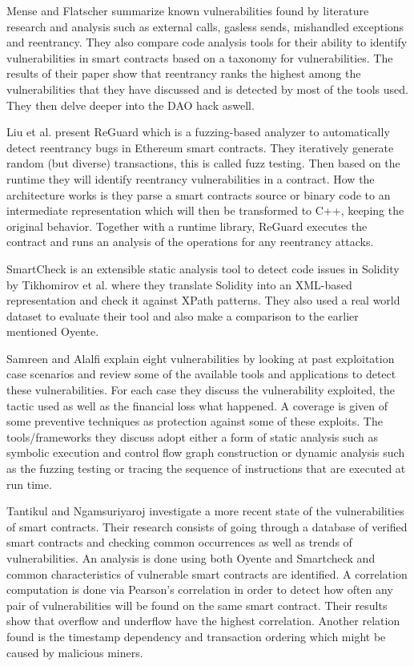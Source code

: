 \documentclass[10pt,conference]{IEEEtran}
\begin{document}
Mense and Flatscher \cite{security} summarize known vulnerabilities found by literature research and analysis such as external calls, gasless sends, mishandled exceptions and reentrancy. They also compare code analysis tools for their ability to identify vulnerabilities in smart contracts based on a taxonomy for vulnerabilities. The results of their paper show that reentrancy ranks the highest among the vulnerabilities that they have discussed and is detected by most of the tools used. They then delve deeper into the DAO hack aswell. 


Liu et al. \cite{reguard} present ReGuard which is a fuzzing-based analyzer to automatically detect reentrancy bugs in Ethereum smart contracts. They iteratively generate random (but diverse) transactions, this is called fuzz testing. Then based on the runtime they will identify reentrancy vulnerabilities in a contract. How the architecture works is they parse a smart contracts source or binary code to an intermediate representation which will then be transformed to C++, keeping the original behavior. Together with a runtime library, ReGuard executes the contract and runs an analysis of the operations for any reentrancy attacks.


SmartCheck is an extensible static analysis tool to detect code issues in Solidity by Tikhomirov et al.\cite{smartcheck} where they translate Solidity into an XML-based representation and check it against XPath patterns. They also used a real world dataset to evaluate their tool and also make a comparison to the earlier mentioned Oyente. 


Samreen and Alalfi  \cite{survey} explain eight vulnerabilities by looking at past exploitation case scenarios and review some of the available tools and applications to detect these vulnerabilities. For each case they discuss the vulnerability exploited, the tactic used as well as the financial loss what happened. A coverage is given of some preventive techniques as protection against some of these exploits. The tools/frameworks they discuss adopt either a form of static analysis such as symbolic execution and control flow graph construction or dynamic analysis such as the fuzzing testing or tracing the sequence of instructions that are executed at run time. 

Tantikul and Ngamsuriyaroj \cite{icissp20} investigate a more recent state of the vulnerabilities of smart contracts. Their research consists of going through a database of verified smart contracts and checking common occurrences as well as trends of vulnerabilities. An analysis is done using both Oyente and Smartcheck and common characteristics of vulnerable smart contracts are identified. A correlation computation is done via Pearson's correlation in order to detect how often any pair of vulnerabilities will be found on the same smart contract. Their results show that overflow and underflow have the highest correlation. Another relation found is the timestamp dependency and transaction ordering which might be caused by malicious miners.  
\end{document}
